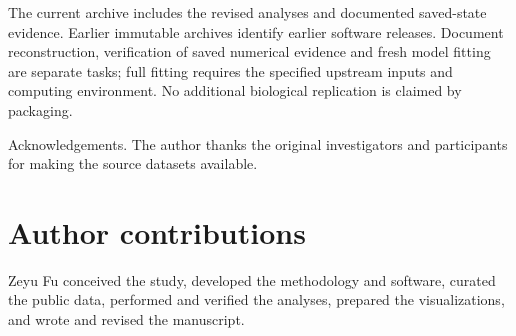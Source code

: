 \documentclass[10pt,a4paper]{article}
\begin{document}
The current archive includes the revised analyses and documented saved-state evidence. Earlier immutable archives identify earlier software releases. Document reconstruction, verification of saved numerical evidence and fresh model fitting are separate tasks; full fitting requires the specified upstream inputs and computing environment. No additional biological replication is claimed by packaging.

Acknowledgements. The author thanks the original investigators and participants for making the source datasets available.
\FloatBarrier



\section*{Author contributions}
Zeyu Fu conceived the study, developed the methodology and software, curated the public data, performed and verified the analyses, prepared the visualizations, and wrote and revised the manuscript.
\end{document}
